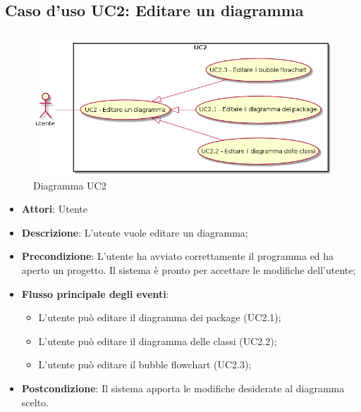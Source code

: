 \documentclass[../AnalisiDeiRequisiti.tex]{subfiles}
\begin{document}
	\subsection{Caso d'uso UC2: Editare un diagramma}
		\begin{figure} [H]
			\centering
			\includegraphics[scale=0.45]{./Figures/UC2.png}
			\caption{Diagramma UC2}\label{}
		\end{figure}
	\begin{itemize}
		\item \textbf{Attori}: Utente
		\item \textbf{Descrizione}: L'utente vuole editare un diagramma;
		\item \textbf{Precondizione}: L'utente ha avviato correttamente il programma ed ha aperto un progetto. Il sistema è pronto per accettare le modifiche dell'utente;
		\item \textbf{Flusso principale degli eventi}: \begin{itemize}
			\item L'utente può editare il diagramma dei package (UC2.1);
			\item L'utente può editare il diagramma delle classi (UC2.2);
			\item L'utente può editare il bubble flowchart (UC2.3);
		\end{itemize}
		\item \textbf{Postcondizione}: Il sistema apporta le modifiche desiderate al diagramma scelto.
	\end{itemize}
\end{document}
